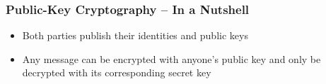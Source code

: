 \documentclass[
	aspectratio=169,
	xetex,
]{beamer}
\begin{document}
\begin{frame}
	\frametitle{Public-Key Cryptography -- In a Nutshell}
	\vspace{3mm}
	\begin{minipage}[t][.65\textheight]{\textwidth}
		\begin{center}
		\end{center}
	\end{minipage}

	\begin{itemize}
		\item Both parties publish their identities and public keys
		\item Any message can be encrypted with anyone's public key and only be decrypted with its corresponding secret key
	\end{itemize}

\end{frame}
\end{document}
